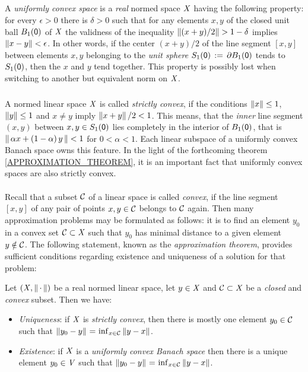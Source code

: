 \documentclass[11pt,twoside]{article}
\begin{document}
\subparagraph*{} %
A \textit{uniformly convex space} is a \textit{real} normed space $\mathit{X}$
having the following property:
for every $\epsilon > 0$ there is $\delta > 0$ 
such that
for any elements $x,y$ of the closed unit ball $B_1({\mathsf{0}})$ of $\mathit{X}$
the validness of the inequality $\left\lVert (x+y)/2 \right\rVert > 1- \delta$
implies $\left\lVert x-y \right\rVert < \epsilon$.
In other words,
if the center $(x+y)/2$ of the line segment $[x,y]$
between elements $x,y$ belonging to the \textit{unit sphere}
$S_1({\mathsf{0}}) \,:=\, \partial B_1({\mathsf{0}})$ tends to $S_1({\mathsf{0}})$,
then the $x$ and $y$ tend together.
This property is possibly lost
when switching to another but equivalent norm on $\mathit{X}$.

\subparagraph*{} %
A normed linear space $\mathit{X}$ is called \textit{strictly convex},
if the conditions
$\left\lVert x \right\rVert \leq 1$, $\left\lVert y \right\rVert \leq 1$ and $x \neq y$
imply
$\left\lVert x+y \right\rVert/2< 1$.
This means,
that the \textit{inner} line segment $(x,y)$
between $x,y \in S_1({\mathsf{0}})$ lies completely in the interior of $B_1({\mathsf{0}})$,
that is
$\left\lVert \,\alpha x + (1-\alpha)\,y\, \right\rVert < 1$ for $0 < \alpha < 1$.
Each linear subspace of a uniformly convex Banach space owns this feature.
In the light of the forthcoming theorem \ref{APPROXIMATION_THEOREM},
it is an important fact
that uniformly convex spaces are also strictly convex.

\paragraph*{} %
Recall that a subset $\mathcal{C}$ of a linear space is called \textit{convex},
if the line segment $[x,y]$ of any pair of points $x,y \in \mathcal{C}$
belongs to $\mathcal{C}$ again.
Then many approximation problems may be formulated as follows:
it is to find an element $y_0$ in a convex set $\mathcal{C} \subset \mathit{X}$
such that $y_0$ has minimal distance to a given element $y \notin \mathcal{C}$.
The following statement,
known as the \textit{approximation theorem},
provides sufficient conditions regarding existence and uniqueness
of a solution for that problem:

\begin{theorem}\label{APPROXIMATION_THEOREM}
Let $(\mathit{X},\left\lVert \,\cdot\, \right\rVert)$ be a real normed linear space,
let $y \in \mathit{X}$ and
$\mathcal{C} \subset \mathit{X}$ be a \textit{closed} and \textit{convex} subset.
Then we have:

\begin{itemize}[leftmargin=25pt,itemsep=2pt]
\item[(a)] \textit{Uniqueness}:
if $\mathit{X}$ is \textit{strictly convex},
then there is mostly one element $y_0 \in \mathcal{C}$
such that $\left\lVert y_0-y \right\rVert {\,=\,} \inf_{x \in \mathcal{C}} \left\lVert y-x \right\rVert$.

\item[(b)] \textit{Existence}:
if $\mathit{X}$ is a \textit{uniformly convex Banach space}
then there is a unique element $y_0 \in \mathit{V}$
such that $\left\lVert y_0-y \right\rVert {\,=\,} \inf_{x \in \mathcal{C}} \left\lVert y-x \right\rVert$.
\end{itemize}
\end{theorem}
\end{document}
